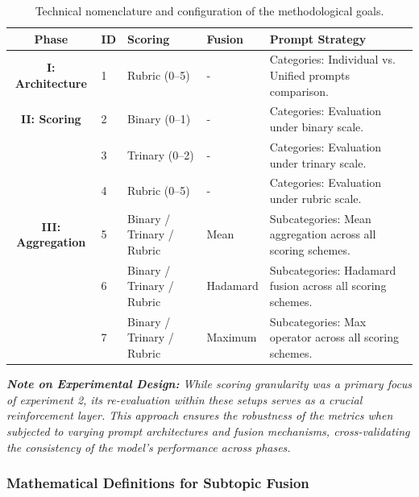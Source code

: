 \begin{table}[!h]%
\centering
\caption{Technical nomenclature and configuration of the methodological goals.}
\label{tab:experiment_names_updated}
\begin{tabular}{@{}clllp{4cm}@{}}
\toprule
\textbf{Phase} & \textbf{ID} & \textbf{Scoring} & \textbf{Fusion} & \textbf{Prompt Strategy} \\ \midrule

\textbf{I: Architecture} 
& 1 & Rubric (0--5) & - & Categories: Individual vs. Unified prompts comparison. \\ \midrule

\textbf{II: Scoring} 
& 2 & Binary (0--1) & - & Categories: Evaluation under binary scale. \\
& 3 & Trinary (0--2) & - & Categories: Evaluation under trinary scale. \\
& 4 & Rubric (0--5) & - & Categories: Evaluation under rubric scale. \\ \midrule

\textbf{III: Aggregation} 
& 5 & Binary / Trinary / Rubric & Mean & Subcategories: Mean aggregation across all scoring schemes. \\
& 6 & Binary / Trinary / Rubric & Hadamard & Subcategories: Hadamard fusion across all scoring schemes. \\
& 7 & Binary / Trinary / Rubric & Maximum & Subcategories: Max operator across all scoring schemes. \\ 

\bottomrule
\end{tabular}

\vspace{2mm} %
\begin{minipage}{0.95\textwidth}
    \small \textit{\textbf{Note on Experimental Design:} While scoring granularity was a primary focus of experiment 2, its re-evaluation within these setups serves as a crucial reinforcement layer. This approach ensures the robustness of the metrics when subjected to varying prompt architectures and fusion mechanisms, cross-validating the consistency of the model's performance across phases.}
\end{minipage}
\end{table}

\newpage

\subsubsection*{Mathematical Definitions for Subtopic Fusion}

